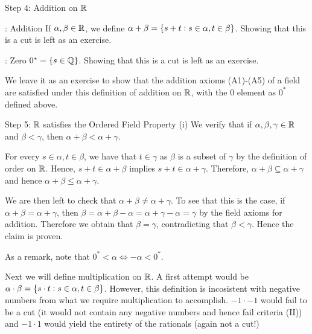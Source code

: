 \begin{nblank}{Step 4: Addition on $\mathbb{R}$}
    \begin{ndef}{: Addition}
        If $\alpha, \beta \in \mathbb{R}$, we define $\alpha + \beta = \set{s + t: s \in \alpha, t \in \beta}$. Showing that this is a cut is left as an exercise.
    \end{ndef}
    \begin{ndef}{: Zero}
        $0^* = \set{s \in \mathbb{Q}}$. Showing that this is a cut is left as an exercise.
    \end{ndef}

    We leave it as an exercise to show that the addition axioms (A1)-(A5) of a field are satisfied under this definition of addition on $\mathbb{R}$, with the 0 element as $0^*$ defined above.
\end{nblank}

\begin{nblank}{Step 5: $\mathbb{R}$ satisfies the Ordered Field Property (i)}
    We verify that if $\alpha, \beta, \gamma \in \mathbb{R}$ and $\beta < \gamma$, then $\alpha + \beta < \alpha + \gamma$. 

    For every $s \in \alpha, t \in \beta$, we have that $t \in \gamma$ as $\beta$ is a subset of $\gamma$ by the definition of order on $\mathbb{R}$. Hence, $s + t \in \alpha + \beta$ implies $s + t \in \alpha + \gamma$. Therefore, $\alpha + \beta \subseteq \alpha + \gamma$ and hence $\alpha + \beta \leq \alpha + \gamma$. 

    We are then left to check that $\alpha + \beta \neq \alpha + \gamma$. To see that this is the case, if $\alpha + \beta = \alpha + \gamma$, then $\beta = \alpha + \beta - \alpha = \alpha + \gamma - \alpha = \gamma$ by the field axioms for addition. Therefore we obtain that $\beta = \gamma$, contradicting that $\beta < \gamma$. Hence the claim is proven.

    As a remark, note that $0^* < \alpha \iff -\alpha < 0^*$.
\end{nblank}
\noindent Next we will define multiplication on $\mathbb{R}$. A first attempt would be $\alpha \cdot \beta = \set{s \cdot t: s\in \alpha, t \in \beta}$. However, this definition is incosistent with negative numbers from what we require multiplication to accomplish. $-1 \cdot -1$ would fail to be a cut (it would not contain any negative numbers and hence fail criteria (II)) and $-1 \cdot 1$ would yield the entirety of the rationals (again not a cut!)

